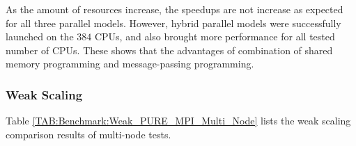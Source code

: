 As the amount of resources increase, the speedups are not increase as expected for all three parallel models.
However, hybrid parallel models were successfully launched on the $384$ CPUs, 
and also brought more performance for all tested number of CPUs.
These shows that the advantages of combination of shared memory programming and message-passing programming.

\subsubsection{Weak Scaling}



Table \ref{TAB:Benchmark:Weak_PURE_MPI_Multi_Node} lists the weak scaling comparison results of multi-node tests.

